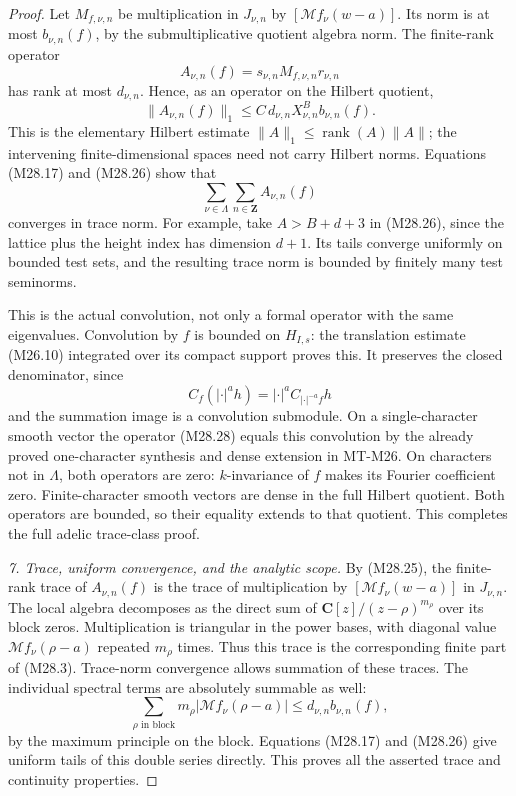 \begin{proof}
Let \(M_{f,\nu,n}\) be multiplication
in \(J_{\nu,n}\) by
\([\mathcal Mf_\nu(w-a)]\). Its norm
is at most \(b_{\nu,n}(f)\), by the
submultiplicative quotient algebra
norm. The finite-rank operator
\[
                 A_{\nu,n}(f)
                    =s_{\nu,n}M_{f,\nu,n}r_{\nu,n}
 \]
has rank at most \(d_{\nu,n}\). Hence,
as an operator on the Hilbert quotient,
\[
 \|A_{\nu,n}(f)\|_1
       \le C\,d_{\nu,n}X_{\nu,n}^B b_{\nu,n}(f).
                                                               \tag{M28.27}
\]
This is the elementary Hilbert estimate
\(\|A\|_1\le\operatorname{rank}(A)\|A\|\);
the intervening finite-dimensional
spaces need not carry Hilbert norms.
Equations (M28.17) and (M28.26) show
that
\[
                  \sum_{\nu\in\Lambda}\sum_{n\in\mathbf Z}
                                      A_{\nu,n}(f)            \tag{M28.28}
\]
converges in trace norm. For example,
take \(A>B+d+3\) in (M28.26), since
the lattice plus the height index
has dimension \(d+1\). Its tails
converge uniformly on bounded test
sets, and the resulting trace norm
is bounded by finitely many test
seminorms.

This is the actual convolution, not
only a formal operator with the
same eigenvalues. Convolution by
\(f\) is bounded on \(H_{I,s}\):
the translation estimate (M26.10)
integrated over its compact support
proves this. It preserves the closed
denominator, since
\[
 C_f(|\cdot|^a h)
       =|\cdot|^a C_{|\cdot|^{-a}f}h
 \]
and the summation image is a
convolution submodule.
On a single-character smooth vector
the operator (M28.28) equals this
convolution by the already proved
one-character synthesis and dense
extension in MT-M26. On characters
not in \(\Lambda\), both operators
are zero: \(k\)-invariance of \(f\)
makes its Fourier coefficient zero.
Finite-character smooth vectors
are dense in the full Hilbert
quotient. Both operators are
bounded, so their equality extends
to that quotient. This completes
the full adelic trace-class proof.

\emph{7. Trace, uniform convergence, and the analytic scope.}
By (M28.25), the finite-rank trace
of \(A_{\nu,n}(f)\) is the trace
of multiplication by
\([\mathcal Mf_\nu(w-a)]\) in
\(J_{\nu,n}\). The local algebra
decomposes as the direct sum of
\(\mathbf C[z]/(z-\rho)^{m_\rho}\)
over its block zeros. Multiplication
is triangular in the power bases,
with diagonal value
\(\mathcal Mf_\nu(\rho-a)\) repeated
\(m_\rho\) times. Thus this trace
is the corresponding finite part
of (M28.3). Trace-norm convergence
allows summation of these traces.
The individual spectral terms
are absolutely summable as well:
\[
 \sum_{\rho\text{ in block}}
    m_\rho|\mathcal Mf_\nu(\rho-a)|
            \le d_{\nu,n}b_{\nu,n}(f),
 \]
by the maximum principle on the
block. Equations (M28.17) and
(M28.26) give uniform tails of
this double series directly.
This proves all the asserted
trace and continuity properties.


\end{proof}
